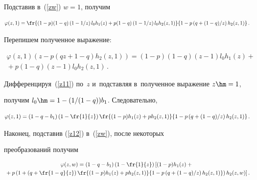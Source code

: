 Подставив в~(\ref{zw}) $w=1$, получим

\begin{equation*}

\varphi(z,1)=\fr{(1-p)(1-q)\left(1-{1}/{z}\right)l_0 h_1(z)+p(1-q)

\left(1-{1}/{z}\right)l_0 h_2(z,1)}{1-p\left(q+(1-q)/z\right)h_2(z,1)}\,.

\end{equation*}

Перепишем полученное выражение:

\begin{multline}

\varphi(z,1)(z-p\left(qz+1-q\right)h_2(z,1))=(1-p)(1-q)\left(z-1\right)l_0 h_1(z)+{}\\

{}+p(1-q)\left(z-1\right)l_0 h_2(z,1)\,.

\label{z11}

\end{multline}

Дифференцируя~(\ref{z11}) по~$z$ и~подставляя в~полученное выражение $z\hm=1$,

получим $l_0\hm=1-(1/(1-q))b_1$. Следовательно,

\begin{equation}

\varphi(z,1)=\left(1-q-b_1\right)\left(1-\fr{1}{z}\right)\fr{(1-p)h_1(z)+ph_2(z,1)}

{1-p\left(q+(1-q)/z\right)h_2(z,1)}\,.

\label{z12}

\end{equation}



Наконец, подставив (\ref{z12}) в~(\ref{zw}), после некоторых

преобразований получим

\begin{multline*}

\varphi(z,w)=(1-q-b_1)\left(1-\fr{1}{z}\right)

\left[ \vphantom{\fr{(1-p)h_1(z)+ph_2(z,1)}{1-p\left(q+(1-q)/z\right)h_2(z,1)}}

(1-p)h_1(z)+{}\right.\\

\left.{}+p\left(1+\left(q+\fr{1-q}{z}\right)

\fr{(1-p)h_1(z)+ph_2(z,1)}{1-p\left(q+(1-q)/z\right)h_2(z,1)}\right)h_2(z,w)\right].

\end{multline*}



